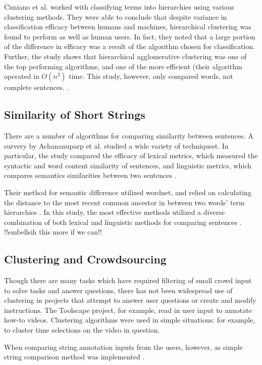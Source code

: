 Cimiano et al. worked with classifying terms into hierarchies using various clustering methods.
They were able to conclude that despite variance in classification efficacy between humans and machines, hierarchical clustering was found to perform as well as human users.
In fact, they noted that a large portion of the difference in efficacy was a result of the algorithm chosen for classification.
Further, the study shows that hierarchical agglomerative clustering was one of the top performing algorithms, and one of the more efficient (their algorithm operated in $O(n^2)$ time.
This study, however, only compared words, not complete sentences. \cite{cimiano2004comparing}.

\subsection{Similarity of Short Strings}
There are a number of algorithms for comparing similarity between sentences.
A survery by Achananuparp et al. studied a wide variety of techniquest. In particular, the study compared the efficacy of lexical metrics, which measured the syntactic and word content similarity of sentences, and linguistic metrics, which compares semantics similarities between two sentences \cite{achananuparp2008evaluation}.

Their method for semantic difference utilized wordnet, and relied on calculating the distance to the most recent common ancestor in between two words' term hierarchies \cite{achananuparp2008evaluation, abdalgader2011short}.
In this study, the most effective methods utilized a diverse combination of both lexical and linguistic methods for comparing sentences \cite{achananuparp2008evaluation}. !!embellsih this more if we can!!

\subsection{Clustering and Crowdsourcing}
Though there are many tasks which have required filtering of small crowd input to solve tasks and answer questions, there has not been widespread use of clustering in projects that attempt to answer user questions or create and modify instructions.
The Toolscape project, for example, read in user input to annotate how-to videos.
Clustering algorithms were used in simple situations: for example, to cluster time selections on the video in question.

When comparing string annotation inputs from the users, however, as simple string comparison method was implemented \cite{kim2013toolscape}. 


